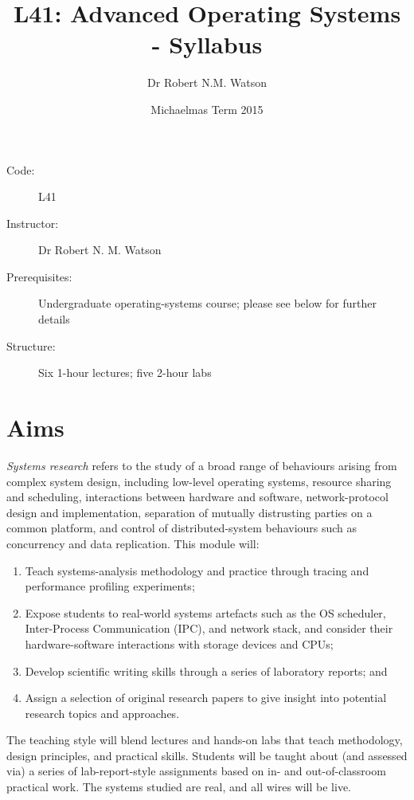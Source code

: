 \documentclass[a4paper,10pt]{article}
\begin{document}
\title{L41: Advanced Operating Systems - Syllabus}
\author{Dr Robert N.M. Watson}
\date{Michaelmas Term 2015}
\maketitle

\noindent
\begin{description}
\item[Code:] L41
\item[Instructor:] Dr Robert N. M. Watson
\item[Prerequisites:] Undergraduate operating-systems course; please see below
  for further details
\item[Structure:] Six 1-hour lectures; five 2-hour labs
\end{description}

\section{Aims}

\textit{Systems research} refers to the study of a broad range of behaviours
arising from complex system design, including low-level operating systems,
resource sharing and scheduling, interactions between hardware and software,
network-protocol design and implementation, separation of mutually distrusting
parties on a common platform, and control of distributed-system behaviours
such as concurrency and data replication.
This module will:

\begin{enumerate}
\item Teach systems-analysis methodology and practice through tracing and
  performance profiling experiments;
\item Expose students to real-world systems artefacts such as the
  OS scheduler, Inter-Process Communication (IPC), and network stack, and
  consider their hardware-software interactions with storage devices and CPUs;
\item Develop scientific writing skills through a series of laboratory
  reports; and
\item Assign a selection of original research papers to give insight into
  potential research topics and approaches.
\end{enumerate}

The teaching style will blend lectures and hands-on labs that teach
methodology, design principles, and practical skills.
Students will be taught about (and assessed via) a series of lab-report-style
assignments based on in- and out-of-classroom practical work.
The systems studied are real, and all wires will be live.
\end{document}
